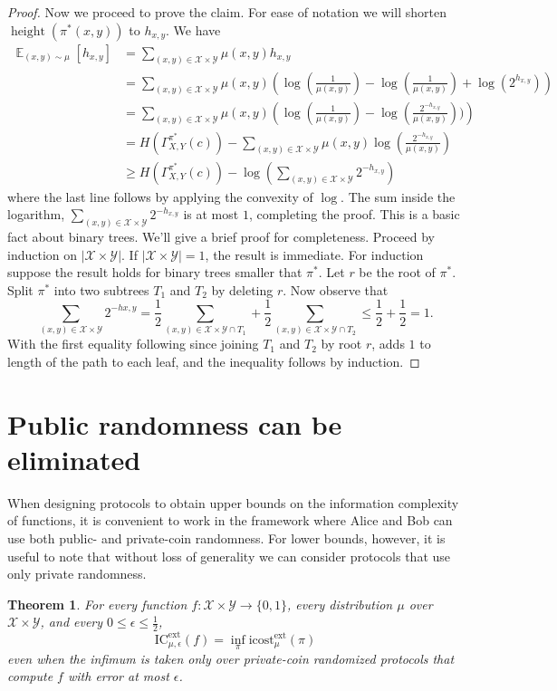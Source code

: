 \documentclass[11pt]{amsart}
\theoremstyle{plain}
\newtheorem{theorem}{Theorem}
\theoremstyle{definition}
\theoremstyle{plain}
\newcommand{\calX}{\mathcal{X}}
\newcommand{\calY}{\mathcal{Y}}
\newcommand{\ICext}{\mathrm{IC}^{\mathrm{ext}}}
\newcommand{\icostext}{\mathrm{icost}^{\mathrm{ext}}}
\DeclareMathOperator{\height}{height}
\DeclareMathOperator*{\E}{\mathbb{E}}
\begin{document}
\begin{proof}
Now we proceed to prove the claim. For ease of notation we will shorten $\height(\pi^*(x,y))$ to $h_{x,y}$. We have
\begin{align*}
\E_{(x,y)\sim \mu}[h_{x,y}] &=\sum_{(x,y)\in \calX\times\calY} \mu(x,y) h_{x,y} \\
&=\sum_{(x,y)\in \calX\times\calY} \mu(x,y)\left(\log(\frac{1}{\mu(x,y)})-\log(\frac{1}{\mu(x,y)}) +\log(2^{h_{x,y}})\right)\\
&=\sum_{(x,y)\in \calX\times\calY} \mu(x,y)\left(\log(\frac{1}{\mu(x,y)})-\log(\frac{2^{-h_{x,y}}}{\mu(x,y)}))\right) \\
&=H(\Gamma^{\pi^*}_{X,Y}(c)) - \sum_{(x,y)\in\calX\times\calY}\mu(x,y)\log(\frac{2^{-h_{x,y}}}{\mu(x,y)}) \\
&\geq H(\Gamma^{\pi^*}_{X,Y}(c)) - \log(\sum_{(x,y)\in\calX\times\calY} 2^{-h_{x,y}})
\end{align*}
where the last line follows by applying the convexity of $\log$. The sum inside the logarithm, $\sum_{(x,y)\in\calX\times\calY} 2^{-h_{x,y}}$ is at most $1$, completing the proof. This is a basic fact about binary trees. We'll give a brief proof for completeness.
Proceed by induction on $|\calX \times \calY|$. If $|\calX\times\calY| = 1$, the result is immediate. For induction suppose the result holds for binary trees smaller that $\pi^*$. Let $r$ be the root of $\pi^*$. Split $\pi^*$ into two subtrees $T_1$ and $T_2$ by deleting $r$. Now observe that
$$\sum_{(x,y)\in \calX\times\calY} 2^{-h{x,y}} = \frac{1}{2}\sum_{(x,y) \in \calX\times\calY \cap T_1} + \frac{1}{2}\sum_{(x,y) \in \calX\times\calY \cap T_2} \leq \frac{1}{2}+\frac{1}{2} = 1.$$
With the first equality following since joining $T_1$ and $T_2$ by root $r$, adds $1$ to length of the path to each leaf, and the inequality follows by induction.
\end{proof}


\newpage 
\section{Public randomness can be eliminated}

When designing protocols to obtain upper bounds on the information complexity of functions, it is convenient to work in the framework where Alice and Bob can use both public- and private-coin randomness. For lower bounds, however, it is useful to note that without loss of generality we can consider protocols that use only private randomness.

\begin{theorem}
For every function $f : \calX \times \calY \to \{0,1\}$, every distribution $\mu$ over $\calX \times \calY$, and every $0 \le \epsilon \le \frac12$,
\[
\ICext_{\mu,\epsilon}(f) = \inf_{\pi} \icostext_\mu(\pi)
\]
even when the infimum is taken only over private-coin randomized protocols that compute $f$ with error at most $\epsilon$.
\end{theorem}
\end{document}
